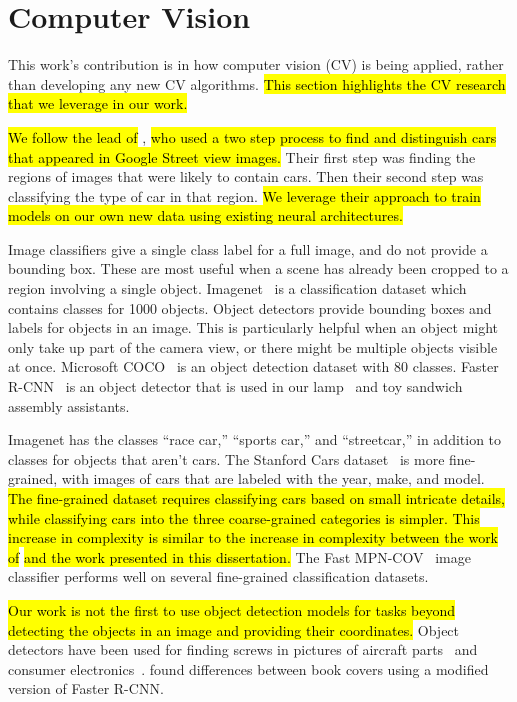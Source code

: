 \section{Computer Vision}

This work's contribution is in how computer vision (CV) is being applied, rather
than developing any new CV algorithms.
\hl{
  This section highlights the CV research that we leverage in our work.
}

\hl{
  We follow the lead of} \citet{gebru2017finegrained}, \hl{who used a two step
  process to find and distinguish cars that appeared in Google Street view
  images.
}
  Their first step was finding the
regions of images that were likely to contain cars. Then their second step was
classifying the type of car in that region.
\hl{
  We leverage their approach to train models on our own new
  data using existing neural architectures.
}

Image classifiers give a single class label for a full image, and do not provide
a bounding box. These are most useful when a scene has already been cropped to a
region involving a single object. Imagenet~\cite{ImageNet_VSS09} is a
classification dataset which contains classes for 1000 objects. Object
detectors provide bounding boxes and labels for objects in an image. This is
particularly helpful
when an object might only take up part of the camera view, or there might be
multiple objects visible
at once. Microsoft COCO~\cite{coco} is an object detection dataset with 80
classes.
Faster R-CNN~\cite{frcnn} is an object detector that is used in our
lamp~\cite{lamp} and toy sandwich~\cite{sandwich} assembly assistants.

Imagenet has the classes ``race car,'' ``sports car,'' and ``streetcar,''
in addition to classes for objects that aren't cars.
The Stanford Cars dataset~\cite{KrauseStarkDengFei-Fei_3DRR2013} is more
fine-grained, with images of cars that are labeled with the year, make, and
model.
\hl{
  The fine-grained dataset requires classifying cars based on small intricate
  details, while classifying cars into the three coarse-grained categories is
  simpler.
  This increase in complexity is similar to the increase in complexity between
  the work of} \citet{chen2017} \hl{and the work presented in this dissertation.
}
The Fast MPN-COV~\cite{Li_2018_CVPR} image classifier performs
well on several fine-grained classification datasets.

\hl{Our work is not the first to use object detection models for tasks beyond
detecting the objects in an image and providing their coordinates.}
Object detectors have been used for finding screws in pictures of aircraft
parts~\cite{visapp19} and consumer electronics~\cite{FOO2021666}.
\citet{wu2018spot} found differences between book covers using a modified
version of Faster R-CNN.

